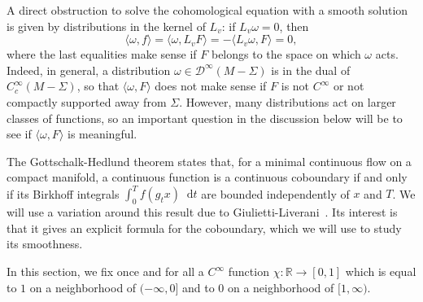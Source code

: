 \documentclass[10pt]{amsart}
\newcommand{\boD}{\mathcal{D}}
\newcommand{\R}{\mathbb{R}}
\newcommand{\dd}{\mathop{}\!\mathrm{d}}
\theoremstyle{definition}
\numberwithin{equation}{section}
\begin{document}
A direct obstruction to solve the cohomological equation with a smooth
solution is given by distributions in the kernel of $L_v$: if $L_v \omega =
0$, then
\begin{equation*}
\langle \omega, f \rangle = \langle \omega, L_v F \rangle
=- \langle L_v \omega, F \rangle = 0,
\end{equation*}
where the last equalities make sense if $F$ belongs to the space on which
$\omega$ acts. Indeed, in general, a distribution $\omega \in
\boD^\infty(M-\Sigma)$ is in the dual of $C^\infty_c(M-\Sigma)$, so that
$\langle \omega, F\rangle$ does not make sense if $F$ is not $C^\infty$ or
not compactly supported away from $\Sigma$. However, many distributions act
on larger classes of functions, so an important question in the discussion
below will be to see if $\langle \omega, F\rangle$ is meaningful.

The Gottschalk-Hedlund theorem states that, for a minimal continuous flow on
a compact manifold, a continuous function is a continuous coboundary if and
only if its Birkhoff integrals $\int_0^T f(g_t x) \dd t$ are bounded
independently of $x$ and $T$. We will use a variation around this result due
to Giulietti-Liverani~\cite{giulietti_liverani}. Its interest is that it
gives an explicit formula for the coboundary, which we will use to study its
smoothness.

In this section, we fix once and for all a $C^\infty$ function $\chi:\R \to
[0,1]$ which is equal to $1$ on a neighborhood of $(-\infty, 0]$ and to $0$
on a neighborhood of $[1,\infty)$.
\end{document}
